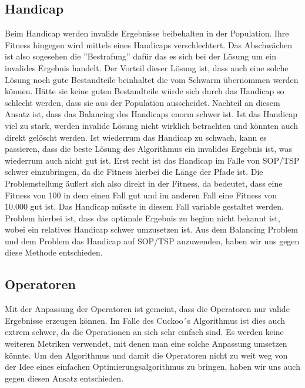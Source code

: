 \documentclass[conference]{IEEEtran}
\begin{document}
    \subsection{Handicap}
      Beim Handicap werden invalide 
      Ergebnisse beibehalten in der Population. Ihre Fitness hingegen wird mittels eines Handicaps 
      verschlechtert. Das Abschwächen ist also sogesehen die ''Bestrafung'' dafür das es sich bei der 
      Lösung um ein invalides Ergebnis handelt. Der Vorteil dieser Lösung ist, dass auch eine solche 
      Lösung noch gute Bestandteile beinhaltet die vom Schwarm übernommen werden können. Hätte sie
      keine guten Bestandteile würde sich durch das Handicap so schlecht werden, dass sie aus der
      Population ausscheidet. Nachteil an diesem Ansatz ist, dass das Balancing des Handicaps 
      enorm schwer ist. Ist das Handicap viel zu stark, werden invalide Lösung nicht wirklich 
      betrachten und könnten auch direkt gelöscht werden. Ist wiederrum das Handicap zu schwach, 
      kann es passieren, dass die beste Lösung des Algorithmus ein invalides Ergebnis ist, was 
      wiederrum auch nicht gut ist. Erst recht ist das Handicap im Falle von SOP/TSP schwer 
      einzubringen, da die Fitness hierbei die Länge der Pfade ist. Die Problemstellung äußert 
      sich also direkt in der Fitness, da bedeutet, dass eine Fitness von 100 in dem einen Fall
      gut und im anderen Fall eine Fitness von 10.000 gut ist. Das Handicap müsste in diesem Fall 
      variable gestaltet werden. Problem hierbei ist, dass das optimale Ergebnis zu beginn nicht 
      bekannt ist, wobei ein relatives Handicap schwer umzusetzen ist. Aus dem Balancing Problem 
      und dem Problem das Handicap auf SOP/TSP anzuwenden, haben wir uns gegen diese Methode 
      entschieden.

    \subsection{Operatoren}
      Mit der Anpassung der Operatoren ist gemeint, dass die Operatoren nur valide Ergebnisse erzeugen 
      können. Im Falle des Cuckoo´s Algorithmus ist dies auch extrem schwer, da die Operationen 
      an sich sehr einfach sind. Es werden keine weiteren Metriken verwendet, mit denen man eine 
      solche Anpassung umsetzen könnte. Um den Algorithmus und damit die Operatoren nicht zu weit
      weg von der Idee eines einfachen Optimierungsalgorithmus zu bringen, haben wir uns auch 
      gegen diesen Ansatz entschieden.
\end{document}
